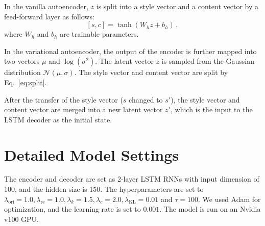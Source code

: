 \documentclass[11pt,a4paper]{article}
\begin{document}
In the vanilla autoencoder, $z$ is split into a style vector and a content vector by a feed-forward layer as follows:
\begin{equation}\label{eq:split}
    [s,c] = \tanh(W_hz+b_h)\,,
\end{equation}
where $W_h$ and $b_h$ are trainable parameters. 

In the variational autoencoder, the output of the encoder is further mapped into two vectors $\mu$ and $\log(\sigma^2)$. The latent vector $z$ is sampled from the Gaussian distribution $\mathcal N(\mu,\sigma)$. The style vector and content vector are split by Eq.~\eqref{eq:split}.

After the transfer of the style vector ($s$ changed to $s'$), the style vector and content vector  are merged into a new latent vector $z'$, which is the input to the LSTM decoder  as the initial state.

\section{Detailed Model Settings}
The encoder and decoder are set as 2-layer LSTM RNNs with input dimension of 100, and the hidden size is 150. The hyperparameters are set to $\lambda_\text{ori}=1.0, \lambda_\text{re}=1.0, \lambda_k=1.5, \lambda_c=2.0, \lambda_\text{KL}=0.01$ and $\tau=100$. We used Adam for optimization, and the learning rate is set to $0.001$. The model is run on an Nvidia v100 GPU. 
\end{document}
